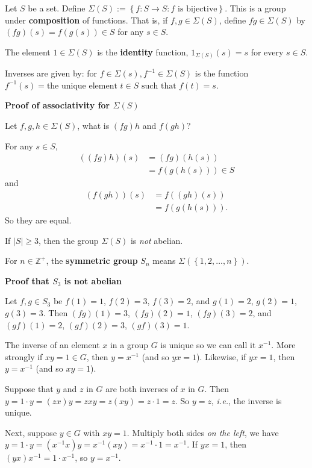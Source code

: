 \documentclass{notes}
\begin{document}
\begin{eg}
  Let $S$ be a set.
  Define $\Sigma(S) := \left \{ f \colon S \to S : \text{$f$ is bijective} \right \}$.
  This is a group under {\boldmath \bfseries composition} of functions.
  That is, if $f, g \in \Sigma(S)$, define $f g \in \Sigma(S)$ by $(f g)(s) = f(g(s)) \in S$ for any $s \in S$.

  The element $1 \in \Sigma(S)$ is the {\boldmath \bfseries identity} function, $1_{\Sigma(S)}(s) = s$ for every $s \in S$.

  Inverses are given by: for $f \in \Sigma(s), f^{-1} \in \Sigma(S)$ is the function $f^{-1}(s) = \text{the unique element $t \in S$ such that $f(t) = s$}$.

  {\boldmath \bfseries Proof of associativity for $\Sigma(S)$}

  Let $f, g, h \in \Sigma(S)$, what is $(f g) h$ and $f (g h)$?

  For any $s \in S$, 
  \begin{align*}
    ((f g) h)(s) &= (f g) (h(s)) \\ 
    &= f(g(h(s))) \in S
  \end{align*}
  and 
  \begin{align*}
    (f (g h))(s) &= f((g h)(s)) \\ 
    &= f(g(h(s))).
  \end{align*}
  So they are equal.

  \begin{note}
    If $\left | S \right | \geq 3$, then the group $\Sigma(S)$ is \textit{not} abelian.

    \begin{defn}
      For $n \in \mathbb Z^+$, the {\boldmath \bfseries symmetric group} $S_n$ means $\Sigma(\left \{ 1, 2, \dots, n \right \})$.
    \end{defn}

    {\boldmath \bfseries Proof that $S_3$ is not abelian}

    Let $f, g \in S_3$ be $f(1) = 1$, $f(2) = 3$, $f(3) = 2$, and $g(1) = 2$, $g(2) = 1$, $g(3) = 3$.
    Then $(f g)(1) = 3$, $(f g)(2) = 1$, $(f g)(3) = 2$, and $(g f)(1) = 2$, $(g f)(2) = 3$, $(g f)(3) = 1$.

  \end{note}
\end{eg}

\begin{lem}
  The inverse of an element $x$ in a group $G$ is unique so we can call it $x^{-1}$.
  More strongly if $x y = 1 \in G$, then $y = x^{-1}$ (and so $y x = 1$).
  Likewise, if $y x = 1$, then $y = x^{-1}$ (and so $x y = 1$).
\end{lem}

\begin{prf}
  Suppose that $y$ and $z$ in $G$ are both inverses of $x$ in $G$.
  Then $y = 1 \cdot y = (z x) y = z x y = z (x y) = z \cdot 1 = z$.
  So $y = z$, \textit{i.e.}, the inverse is unique.

  Next, suppose $y \in G$ with $x y = 1$.
  Multiply both sides \textit{on the left}, we have $y = 1 \cdot y = (x^{-1} x) y = x^{-1} (x y) = x^{-1} \cdot 1 = x^{-1}$.
  If $y x = 1$, then $(y x) x^{-1} = 1 \cdot x^{-1}$, so $y = x^{-1}$.
\end{prf}
\end{document}
